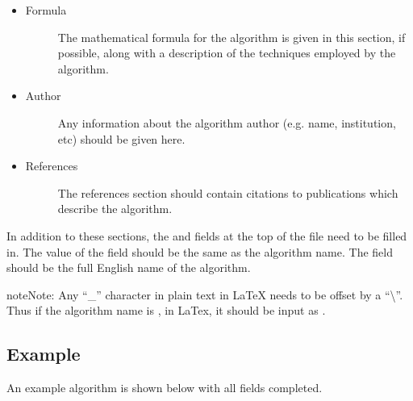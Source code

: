 \documentclass[a4paper,10pt,openany,english]{sphinxmanual}
\begin{document}
\begin{itemize}
\item {} \begin{description}
\item[{Formula}] \leavevmode
The mathematical formula for the algorithm is given in this section, if possible, along with a description of the techniques employed by the algorithm.

\end{description}

\item {} \begin{description}
\item[{Author}] \leavevmode
Any information about the algorithm author (e.g. name, institution, etc) should be given here.

\end{description}

\item {} \begin{description}
\item[{References}] \leavevmode
The references section should contain citations to publications which describe the algorithm.

\end{description}

\end{itemize}

In addition to these sections, the  and  fields at the top of the file need to be filled in. The value of the  field should be the same as the algorithm name. The  field should be the full English name of the algorithm.

\begin{sphinxadmonition}{note}{Note:}
Any ``\_'' character in plain text in LaTeX needs to be offset by a ``\textbackslash{}''. Thus if the algorithm name is , in LaTex, it should be input as .
\end{sphinxadmonition}


\subsection{Example}
\label{alg_development:example}
An example algorithm is shown below with all fields completed.
\end{document}
